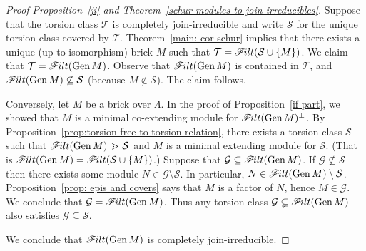\documentclass[ALCO,ThmDefs,Unicode,epreuves]{cedram}
\newcommand{\calG}{\mathcal{G}}
\newcommand{\calS}{\mathcal{S}}
\newcommand{\calT}{\mathcal{T}}
\newcommand{\filt}{\mathscr{F}\Mk ilt}
\newcommand{\covers}{{\,\,\,\cdot\!\!\!\! >\,\,}}
\newcommand{\Gen}{\operatorname{Gen}}
\renewcommand{\1}{\hat{1}}
\newcommand{\0}{\hat{0}}
\newcommand*{\Mk}{\mkern -2mu}
\begin{document}
\begin{proof}[Proof Proposition~\ref{ji} and Theorem~\ref{schur modules to join-irreducibles}]
Suppose that the torsion class $\calT$ is completely join-irreducible
and write $\calS$ for the unique torsion class covered by $\calT$.
Theorem~\ref{main: cor schur} implies that there exists a unique (up to isomorphism) brick $M$ such that ${\calT = \filt(\calS \cup \{M\})}$.
We claim that $\calT = \filt(\Gen M)$.
Observe that $\filt(\Gen M)$ is contained in $\calT$, and $\filt(\Gen M) \not\subseteq\calS$ (because $M\not\in \calS$).
The claim follows.

Conversely, let $M$ be a brick over $\Lambda$.
In the proof of Proposition~\ref{if part}, we showed that $M$ is a minimal co-extending module for $\filt(\Gen M)^\perp$.
By Proposition~\ref{prop:torsion-free-to-torsion-relation}, there exists a torsion class $\calS$ such that $\filt(\Gen M) \covers \calS$ and $M$ is a minimal extending module for $\calS$.
(That is $\filt(\Gen M) = \filt(\calS \cup \{M\})$.)
Suppose that $\calG\subseteq \filt(\Gen M)$.
If $\calG\not \subseteq \calS$ then there exists some module $N\in \calG\setminus \calS$.
In particular, $N\in\filt(\Gen M) \setminus \calS$.
Proposition~\ref{prop: epis and covers} says that $M$ is a factor of $N$, hence $M\in \calG$.
We conclude that $\calG= \filt(\Gen M)$.
Thus any torsion class $\calG\subsetneq\filt(\Gen M)$ also satisfies
$\calG\subseteq\calS$. 

We conclude that $\filt(\Gen M)$ is completely join-irreducible.
\end{proof}
\end{document}
